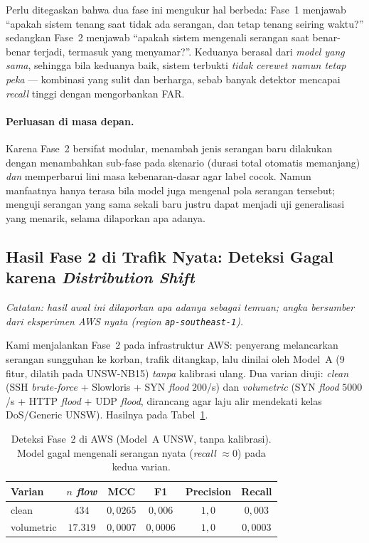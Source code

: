 \documentclass[11pt,a4paper]{article}
\begin{document}
Perlu ditegaskan bahwa dua fase ini mengukur hal berbeda: Fase~1 menjawab
``apakah sistem tenang saat tidak ada serangan, dan tetap tenang seiring waktu?''
sedangkan Fase~2 menjawab ``apakah sistem mengenali serangan saat benar-benar
terjadi, termasuk yang menyamar?''. Keduanya berasal dari \emph{model yang sama},
sehingga bila keduanya baik, sistem terbukti \emph{tidak cerewet namun tetap
peka} --- kombinasi yang sulit dan berharga, sebab banyak detektor mencapai
\emph{recall} tinggi dengan mengorbankan FAR.

\paragraph{Perluasan di masa depan.} Karena Fase~2 bersifat modular, menambah
jenis serangan baru dilakukan dengan menambahkan sub-fase pada skenario (durasi
total otomatis memanjang) \emph{dan} memperbarui lini masa kebenaran-dasar agar
label cocok. Namun manfaatnya hanya terasa bila model juga mengenal pola serangan
tersebut; menguji serangan yang sama sekali baru justru dapat menjadi uji
generalisasi yang menarik, selama dilaporkan apa adanya.

\subsection{Hasil Fase 2 di Trafik Nyata: Deteksi Gagal karena \emph{Distribution Shift}}
\label{sec:rt-phase2}

\noindent\emph{Catatan: hasil awal ini dilaporkan apa adanya sebagai temuan; angka
bersumber dari eksperimen AWS nyata (region \texttt{ap-southeast-1}).}

Kami menjalankan Fase~2 pada infrastruktur AWS: penyerang melancarkan serangan
sungguhan ke korban, trafik ditangkap, lalu dinilai oleh Model~A (9 fitur,
dilatih pada UNSW-NB15) \emph{tanpa} kalibrasi ulang. Dua varian diuji:
\emph{clean} (SSH \emph{brute-force} + Slowloris + SYN \emph{flood} $200$/s) dan
\emph{volumetric} (SYN \emph{flood} $5000$/s + HTTP \emph{flood} + UDP \emph{flood},
dirancang agar laju alir mendekati kelas DoS/Generic UNSW). Hasilnya pada
Tabel~\ref{tab:rt-detect}.

\begin{table}[h]
\centering
\caption{Deteksi Fase~2 di AWS (Model~A UNSW, tanpa kalibrasi). Model gagal
mengenali serangan nyata (\emph{recall} $\approx 0$) pada kedua varian.}
\label{tab:rt-detect}
\small
\begin{tabular}{lccccc}
\toprule
Varian & $n$ \emph{flow} & MCC & F1 & Precision & Recall \\
\midrule
clean       & $434$    & $0{,}0265$ & $0{,}006$  & $1{,}0$ & $0{,}003$ \\
volumetric  & $17{.}319$ & $0{,}0007$ & $0{,}0006$ & $1{,}0$ & $0{,}0003$ \\
\bottomrule
\end{tabular}
\end{table}
\end{document}
